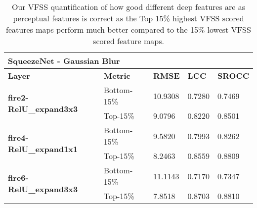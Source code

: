 \documentclass[10pt,twocolumn,letterpaper]{article}
\begin{document}
\begin{table*}[]
\caption{Our VFSS quantification of how good different deep features are as perceptual features is correct as the Top 15\% highest VFSS scored features maps perform much better compared to the 15\% lowest VFSS scored feature maps.}
\centering
\begin{tabular}{|l|l|l|l|l|}
\hline
\multicolumn{5}{|l|}{\textbf{SqueezeNet - Gaussian Blur}}                                                         \\ \hline
\textbf{Layer}                                  & \textbf{Metric} & \textbf{RMSE} & \textbf{LCC} & \textbf{SROCC} \\ \hline
\multirow{2}{*}{\textbf{fire2-RelU\_expand3x3}} & Bottom-15\%            & 10.9308       & 0.7280       & 0.7469         \\ \cline{2-5}
                                                & Top-15\%             & 9.0796        & 0.8220       & 0.8501         \\ \hline
\multirow{2}{*}{\textbf{fire4-RelU\_expand1x1}} & Bottom-15\%             & 9.5820        & 0.7993       & 0.8262         \\ \cline{2-5}
                                                & Top-15\%             & 8.2463        & 0.8559       & 0.8809         \\ \hline
\multirow{2}{*}{\textbf{fire6-RelU\_expand3x3}} & Bottom-15\%             & 11.1143       & 0.7170       & 0.7347         \\ \cline{2-5}
                                                & Top-15\%             & 7.8518        & 0.8703       & 0.8810         \\ \hline
\end{tabular}
\end{table*}
\end{document}
